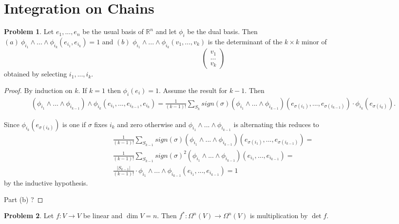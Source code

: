 \documentclass[20pt]{article}
\theoremstyle{plain}
\theoremstyle{definition}
\newtheorem*{problem}{Problem}
\begin{document}
\break
\section{Integration on Chains}



\begin{problem}{4.1}
  Let $e_1, ..., e_n$ be the usual basis of $\mathbb{R}^n$ and let $\phi_i$ be the dual basis.
  Then \\
  $(a) \ \phi_{i_1} \wedge ... \wedge \phi_{i_k} (e_{i_1}, e_{i_k}) = 1$ and
  $(b)$ $\phi_{i_1} \wedge ... \wedge \phi_{i_k}(v_1, ..., v_k)$ is the determinant of 
  the $k \times k$ minor of 
  $$\begin{pmatrix}v_1 \\ ...\\ v_k\end{pmatrix}$$
  obtained by selecting $i_1, ..., i_k$.
\end{problem}

\begin{proof}
  By induction on $k$.
  If $k = 1$ then $\phi_i(e_i) = 1.$
  Assume the result for $k-1$. Then
  \begin{align*}
    (\phi_{i_{1}} \wedge ... \wedge \phi_{i_{k-1}}) \wedge \phi_{i_{k}}
    (e_{i_1}, ..., e_{i_{k-1}}, e_{i_{k}})=
    \frac{1}{(k-1)!} \sum_{S_k}sign(\sigma)(\phi_{i_{1}} \wedge ... \wedge \phi_{i_{k-1}})(e_{\sigma(i_1)}, ..., e_{\sigma(i_{k-1})}) \cdot
     \phi_{i_{k}}(e_{\sigma(i_k)}).
  \end{align*}

  Since $\phi_{i_{k}}(e_{\sigma(i_k)})$ is one if $\sigma$ fixes $i_k$ and zero otherwise and
  $\phi_{i_{1}} \wedge ... \wedge \phi_{i_{k-1}}$ is alternating this reduces to 
  \begin{align*}
    \frac{1}{(k-1)!} \sum_{S_{k-1}}sign(\sigma)(\phi_{i_{1}} \wedge ... \wedge \phi_{i_{k-1}})(e_{\sigma(i_1)}, ..., e_{\sigma(i_{k-1})}) = \\
    \frac{1}{(k-1)!} \sum_{S_{k-1}}sign(\sigma)^2(\phi_{i_{1}} \wedge ... \wedge \phi_{i_{k-1}})(e_{i_1}, ..., e_{i_{k-1}}) = \\
    \frac{|S_{k-1}|}{(k-1)!} \cdot  \phi_{i_{1}} \wedge ... \wedge \phi_{i_{k-1}} (e_{i_1}, ..., e_{i_{k-1}}) = 1
  \end{align*}
  by the inductive hypothesis.

  \color{ForestGreen} Part (b) ?
\end{proof}


  \begin{problem}{4.2}
    Let $f: V \to V$ be linear and $\dim V = n$.
    Then $f^*: \Omega^n(V) \to \Omega^n(V)$ is multiplication by $\det f$.
  \end{problem}
\end{document}
